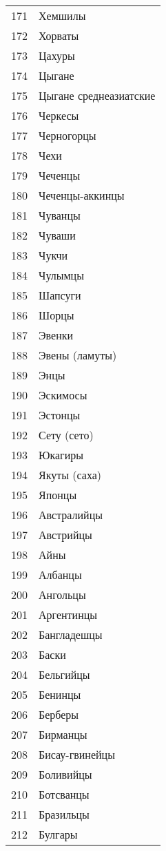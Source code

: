 \documentclass[10pt, a4paper, titlepage]{article}
\begin{document}
\begin{xtabular}{rp{.38\textwidth}}
    171 & Хемшилы \\
    172 & Хорваты \\
    173 & Цахуры \\
    174 & Цыгане \\
    175 & Цыгане среднеазиатские \\
    176 & Черкесы \\
    177 & Черногорцы \\
    178 & Чехи \\
    179 & Чеченцы \\
    180 & Чеченцы-аккинцы \\
    181 & Чуванцы \\
    182 & Чуваши \\
    183 & Чукчи \\
    184 & Чулымцы \\
    185 & Шапсуги \\
    186 & Шорцы \\
    187 & Эвенки \\
    188 & Эвены (ламуты) \\
    189 & Энцы \\
    190 & Эскимосы \\
    191 & Эстонцы \\
    192 & Сету (сето) \\
    193 & Юкагиры \\
    194 & Якуты (саха) \\
    195 & Японцы \\
    196 & Австралийцы \\
    197 & Австрийцы \\
    198 & Айны \\
    199 & Албанцы \\
    200 & Ангольцы \\
    201 & Аргентинцы \\
    202 & Бангладешцы \\
    203 & Баски \\
    204 & Бельгийцы \\
    205 & Бенинцы \\
    206 & Берберы \\
    207 & Бирманцы \\
    208 & Бисау-гвинейцы \\
    209 & Боливийцы \\
    210 & Ботсванцы \\
    211 & Бразильцы \\
    212 & Булгары \\

\end{xtabular}
\end{document}
